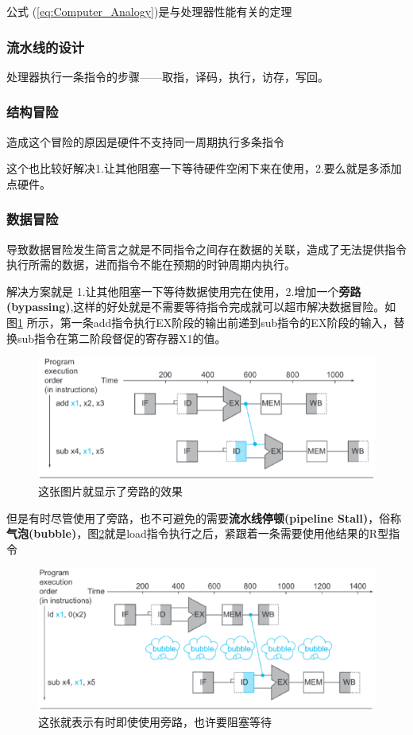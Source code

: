 公式 (\ref{eq:Computer_Analogy})是与处理器性能有关的定理

\subsubsection{流水线的设计}
处理器执行一条指令的步骤——取指，译码，执行，访存，写回。

\subsubsection{结构冒险}
造成这个冒险的原因是硬件不支持同一周期执行多条指令

这个也比较好解决1.让其他阻塞一下等待硬件空闲下来在使用，2.要么就是多添加点硬件。



\subsubsection{数据冒险}
导致数据冒险发生简言之就是不同指令之间存在数据的关联，造成了无法提供指令执行所需的数据，进而指令不能在预期的时钟周期内执行。

解决方案就是 1.让其他阻塞一下等待数据使用完在使用，2.增加一个\textbf{旁路(bypassing)},这样的好处就是不需要等待指令完成就可以超市解决数据冒险。如图\ref{fig:Data_Hazards1} 所示，第一条add指令执行EX阶段的输出前递到sub指令的EX阶段的输入，替换sub指令在第二阶段督促的寄存器X1的值。

\begin{figure}[htbp]
  \centering %
  \includegraphics[width=0.8 \textwidth]{figs/RISC-V/流水线/数据冒险1.eps}
  \caption{这张图片就显示了旁路的效果}
  \label{fig:Data_Hazards1} %
\end{figure}

但是有时尽管使用了旁路，也不可避免的需要\textbf{流水线停顿(pipeline Stall)}，俗称\textbf{气泡(bubble)}，图\ref{fig:Data_Hazards2}就是load指令执行之后，紧跟着一条需要使用他结果的R型指令

\begin{figure}[htbp]
  \centering %
  \includegraphics[width=0.8 \textwidth]{figs/RISC-V/流水线/数据冒险2.eps}
  \caption{这张就表示有时即使使用旁路，也许要阻塞等待}
  \label{fig:Data_Hazards2} %
\end{figure}


